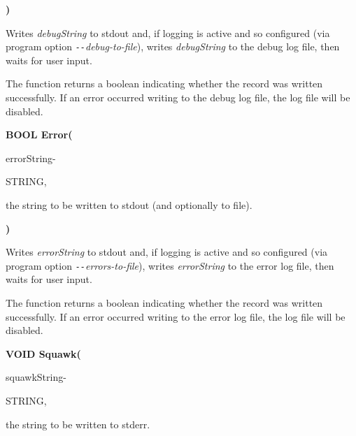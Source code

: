 \textbf{)}

\medskip 
Writes \textit{debugString} to stdout and, if logging is active and so configured (via program option \textit{\texttt{-{}-}debug-to-file}), writes \textit{debugString} to the debug log file, then waits for user input.

The function returns a boolean indicating whether the record was written successfully. If an error occurred writing to the debug log file, the log file will be disabled.

\bigskip
\textbf{BOOL Error(}

\hfill
\begin{minipage}{\dimexpr\textwidth-2em}
    \medskip
    \begin{minipage}[t][][b]{9.5em}errorString\hfill{-}\end{minipage}
        \begin{minipage}[t][][b]{5.5em}STRING,\hfill\end{minipage}
    \begin{minipage}[t][][b]{\dimexpr\textwidth-15.5em}
        the string to be written to stdout (and optionally to file).
    \end{minipage}\vfill
\end{minipage}

\textbf{)}

\medskip
Writes \textit{errorString} to stdout and, if logging is active and so configured (via program option \textit{\texttt{-{}-}errors-to-file}), writes \textit{errorString} to the error log file, then waits for user input.

The function returns a boolean indicating whether the record was written successfully. If an error occurred writing to the error log file, the log file will be disabled.

\bigskip 
\textbf{VOID Squawk(}

\hfill
\begin{minipage}{\dimexpr\textwidth-2em}
    \medskip
    \begin{minipage}[t][][b]{9.5em}squawkString\hfill{-}\end{minipage}
        \begin{minipage}[t][][b]{5.5em}STRING,\hfill\end{minipage}
    \begin{minipage}[t][][b]{\dimexpr\textwidth-15.5em}
        the string to be written to stderr.
    \end{minipage}\vfill
\end{minipage}

